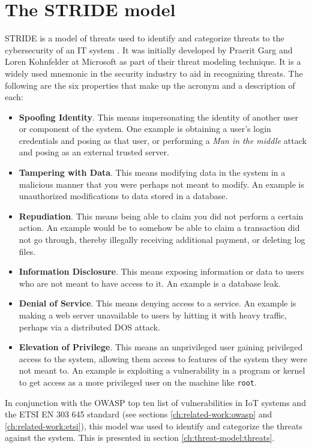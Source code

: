 \section{The STRIDE model} \label{ch:method:stride}
STRIDE is a model of threats used to identify and categorize threats to the cybersecurity of an IT system \cite{stride}. It was initially developed by Praerit Garg and Loren Kohnfelder at Microsoft as part of their threat modeling technique. It is a widely used mnemonic in the security industry to aid in recognizing threats. The following are the six properties that make up the acronym and a description of each:
\begin{itemize}
    \item \textbf{Spoofing Identity}. This means impersonating the identity of another user or component of the system. One example is obtaining a user's login credentials and posing as that user, or performing a \textit{Man in the middle} attack and posing as an external trusted server.
    
    \item \textbf{Tampering with Data}. This means modifying data in the system in a malicious manner that you were perhaps not meant to modify. An example is unauthorized modifications to data stored in a database.
    
    \item \textbf{Repudiation}. This means being able to claim you did not perform a certain action. An example would be to somehow be able to claim a transaction did not go through, thereby illegally receiving additional payment, or deleting log files.
    
    \item \textbf{Information Disclosure}. This means exposing information or data to users who are not meant to have access to it. An example is a database leak.
    
    \item \textbf{Denial of Service}. This means denying access to a service. An example is making a web server unavailable to users by hitting it with heavy traffic, perhaps via a distributed \gls{DOS} attack.
    
    \item \textbf{Elevation of Privilege}. This means an unprivileged user gaining privileged access to the system, allowing them access to features of the system they were not meant to. An example is exploiting a vulnerability in a program or kernel to get access as a more privileged user on the machine like \texttt{root}.
\end{itemize}
In conjunction with the OWASP top ten list of vulnerabilities in IoT systems and the ETSI EN 303 645 standard (see sections \ref{ch:related-work:owasp} and \ref{ch:related-work:etsi}), this model was used to identify and categorize the threats against the system. This is presented in section \ref{ch:threat-model:threats}.
